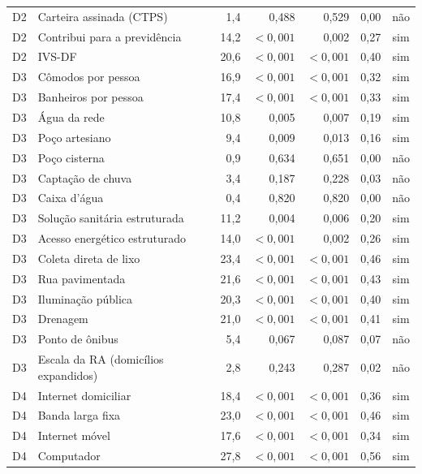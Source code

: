 {\begin{longtable}{@{}l l r r r r c@{}}
D2 & Carteira assinada (CTPS) & 1,4 & 0,488 & 0,529 & 0,00 & não \\
D2 & Contribui para a previdência & 14,2 & $<0{,}001$ & 0,002 & 0,27 & sim \\
D2 & IVS-DF & 20,6 & $<0{,}001$ & $<0{,}001$ & 0,40 & sim \\
D3 & Cômodos por pessoa & 16,9 & $<0{,}001$ & $<0{,}001$ & 0,32 & sim \\
D3 & Banheiros por pessoa & 17,4 & $<0{,}001$ & $<0{,}001$ & 0,33 & sim \\
D3 & Água da rede & 10,8 & 0,005 & 0,007 & 0,19 & sim \\
D3 & Poço artesiano & 9,4 & 0,009 & 0,013 & 0,16 & sim \\
D3 & Poço cisterna & 0,9 & 0,634 & 0,651 & 0,00 & não \\
D3 & Captação de chuva & 3,4 & 0,187 & 0,228 & 0,03 & não \\
D3 & Caixa d'água & 0,4 & 0,820 & 0,820 & 0,00 & não \\
D3 & Solução sanitária estruturada & 11,2 & 0,004 & 0,006 & 0,20 & sim \\
D3 & Acesso energético estruturado & 14,0 & $<0{,}001$ & 0,002 & 0,26 & sim \\
D3 & Coleta direta de lixo & 23,4 & $<0{,}001$ & $<0{,}001$ & 0,46 & sim \\
D3 & Rua pavimentada & 21,6 & $<0{,}001$ & $<0{,}001$ & 0,43 & sim \\
D3 & Iluminação pública & 20,3 & $<0{,}001$ & $<0{,}001$ & 0,40 & sim \\
D3 & Drenagem & 21,0 & $<0{,}001$ & $<0{,}001$ & 0,41 & sim \\
D3 & Ponto de ônibus & 5,4 & 0,067 & 0,087 & 0,07 & não \\
D3 & Escala da RA (domicílios expandidos) & 2,8 & 0,243 & 0,287 & 0,02 & não \\
D4 & Internet domiciliar & 18,4 & $<0{,}001$ & $<0{,}001$ & 0,36 & sim \\
D4 & Banda larga fixa & 23,0 & $<0{,}001$ & $<0{,}001$ & 0,46 & sim \\
D4 & Internet móvel & 17,6 & $<0{,}001$ & $<0{,}001$ & 0,34 & sim \\
D4 & Computador & 27,8 & $<0{,}001$ & $<0{,}001$ & 0,56 & sim \\
\end{longtable}
}
